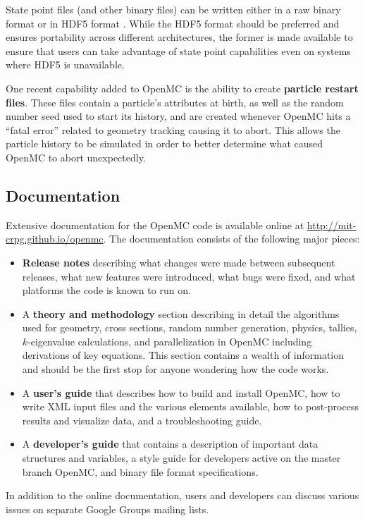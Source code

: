 \documentclass[5p,authoryear]{elsarticle}
\begin{document}
State point files (and other binary files) can be written either in a raw binary
format or in HDF5 format \citep{hdf5-koranne-2011}. While the HDF5 format should
be preferred and ensures portability across different architectures, the former
is made available to ensure that users can take advantage of state point
capabilities even on systems where HDF5 is unavailable.

One recent capability added to OpenMC is the ability to create \textbf{particle
  restart files}. These files contain a particle's attributes at birth, as well
as the random number seed used to start its history, and are created whenever
OpenMC hits a ``fatal error'' related to geometry tracking causing it to
abort. This allows the particle history to be simulated in order to better
determine what caused OpenMC to abort unexpectedly.

\subsection{Documentation}

Extensive documentation for the OpenMC code is available online at
\url{http://mit-crpg.github.io/openmc}. The documentation consists of the
following major pieces:
\begin{itemize}
\item \textbf{Release notes} describing what changes were made between
  subsequent releases, what new features were introduced, what bugs were fixed,
  and what platforms the code is known to run on.
\item A \textbf{theory and methodology} section describing in detail the
  algorithms used for geometry, cross sections, random number generation,
  physics, tallies, $k$-eigenvalue calculations, and parallelization in OpenMC
  including derivations of key equations. This section contains a wealth of
  information and should be the first stop for anyone wondering how the code
  works.
\item A \textbf{user's guide} that describes how to build and install OpenMC,
  how to write XML input files and the various elements available, how to
  post-process results and visualize data, and a troubleshooting guide.
\item A \textbf{developer's guide} that contains a description of important data
  structures and variables, a style guide for developers active on the master
  branch OpenMC, and binary file format specifications.
\end{itemize}
In addition to the online documentation, users and developers can discuss
various issues on separate Google Groups mailing lists.
\end{document}
